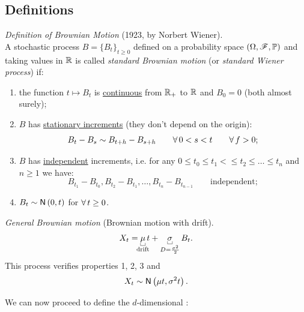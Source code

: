 \documentclass{report}
\begin{document}
\subsection{Definitions}
\begin{definition}
	\emph{Definition of Brownian Motion} (1923, by Norbert Wiener).\\
	A stochastic process $B={\{B_{t}\}}_{t\geq 0}$ defined on a probability space $(\Omega,\mathscr{F},\mathbb{P})$ and taking values in $\mathbb{R}$ is called \emph{standard Brownian motion} (or \emph{standard Wiener process}) if:
	\begin{enumerate}
		\item the function $t\mapsto B_{t}$ is \ul{continuous} from $\mathbb{R}_{+}$ to $\mathbb{R}$ and $B_{0}=0$ (both almost surely);
		\item $B$ has \ul{stationary increments} (they don't depend on the origin):
		\begin{equation*}
			B_{t}-B_{s}\sim B_{t+h}-B_{s+h}\qquad\forall\, 0<s<t\qquad\forall\, f>0;
		\end{equation*}
		\item $B$ has \ul{independent} increments, i.e. for any $0\leq t_{0}\leq t_{1}<\leq t_{2}\leq\ldots\leq t_{n}$ and $n\geq 1$ we have:
		\begin{equation*}
			B_{t_1}-B_{t_0}, B_{t_2}-B_{t_1},\ldots,B_{t_{n}}-B_{t_{n-1}}\qquad\text{independent};
		\end{equation*}
		\item $B_{t}\sim\mathsf{N}\left(0,t\right)$ for $\forall\, t\geq 0$.
	\end{enumerate}
\end{definition}
\begin{definition}
	\emph{General Brownian motion} (Brownian motion with drift).\\
	\begin{equation*}
		X_{t}=\ubracketthin{\mu}_{\claptext{drift}} t+\ubracketthin{\sigma}_{D=\frac{\sigma^{2}}{2}} B_{t}.
	\end{equation*}
	This process verifies properties 1, 2, 3 and
	\begin{equation*}
		X_{t}\sim\mathsf{N}\left(\mu t,\sigma^{2}t\right).
	\end{equation*}
\end{definition}
We can now proceed to define the $d$-dimensional \bwm{}:
\end{document}

